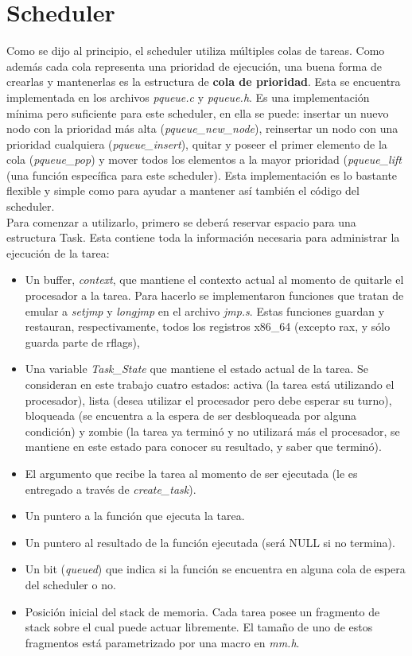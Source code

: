 \documentclass[a4paper]{article}
\begin{document}
\section{Scheduler}
Como se dijo al principio, el scheduler utiliza múltiples colas de tareas.
Como además cada cola representa una prioridad de ejecución, una buena forma
de crearlas y mantenerlas es la estructura de \textbf{cola de prioridad}.
Esta se encuentra implementada en los archivos \textit{pqueue.c} y
\textit{pqueue.h}. Es una implementación mínima pero suficiente para este
scheduler, en ella se puede: insertar un nuevo nodo con la prioridad más
alta (\textit{pqueue\_new\_node}), reinsertar un nodo con una prioridad
cualquiera (\textit{pqueue\_insert}), quitar y poseer el primer elemento
de la cola (\textit{pqueue\_pop}) y mover todos los elementos a la mayor
prioridad (\textit{pqueue\_lift} (una función específica para este scheduler).
Esta implementación es lo bastante flexible y simple como para ayudar a
mantener así también el código del scheduler. \\
Para comenzar a utilizarlo, primero se deberá reservar espacio para una
estructura Task. Esta contiene toda la información necesaria para
administrar la ejecución de la tarea: 
\begin{itemize}
    \item Un buffer, \textit{context}, que mantiene el contexto actual al
    momento de quitarle el procesador a la tarea. Para hacerlo se
    implementaron funciones que tratan de emular a \textit{setjmp} y
    \textit{longjmp} en el archivo \textit{jmp.s}. Estas funciones guardan
    y restauran, respectivamente, todos los registros x86\_64 (excepto rax,
    y sólo guarda parte de rflags),
    \item Una variable \textit{Task\_State} que mantiene el estado actual
    de la tarea. Se consideran en este trabajo cuatro estados: activa
    (la tarea está utilizando el procesador), lista (desea utilizar el
    procesador pero debe esperar su turno), bloqueada (se encuentra a
    la espera de ser desbloqueada por alguna condición) y zombie (la
    tarea ya terminó y no utilizará más el procesador, se mantiene en
    este estado para conocer su resultado, y saber que terminó).
    \item El argumento que recibe la tarea al momento de ser ejecutada
    (le es entregado a través de \textit{create\_task}).
    \item Un puntero a la función que ejecuta la tarea.
    \item Un puntero al resultado de la función ejecutada (será NULL
    si no termina).
    \item Un bit (\textit{queued}) que indica si la función se encuentra
    en alguna cola de espera del scheduler o no.
    \item Posición inicial del stack de memoria. Cada tarea posee un
    fragmento de stack sobre el cual puede actuar libremente. El tamaño
    de uno de estos fragmentos está parametrizado por una macro en
    \textit{mm.h}.
\end{itemize}
\end{document}

